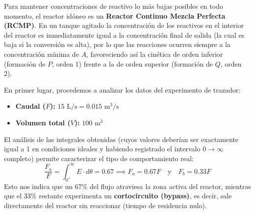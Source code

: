 Para mantener concentraciones de reactivo lo más bajas posibles en todo momento, el reactor idóneo es un \textbf{Reactor Continuo Mezcla Perfecta (RCMP)}. En un tanque agitado la concentración de los reactivos en el interior del reactor es inmediatamente igual a la concentración final de salida (la cual es baja si la conversión es alta), por lo que las reacciones ocurren siempre a la concentración mínima de $A$, favoreciendo así la cinética de orden inferior (formación de $P$, orden 1) frente a la de orden superior (formación de $Q$, orden 2).

\begin{center}
\end{center}

\solve{}
En primer lugar, procedemos a analizar los datos del experimento de trazador:
\begin{itemize}
	\item \textbf{Caudal ($F$):} $15\text{ L/s} = 0.015\text{ m}^3\text{/s}$
	\item \textbf{Volumen total ($V$):} $100\text{ m}^3$
\end{itemize}

El análisis de las integrales obtenidas (cuyos valores deberían ser exactamente igual a 1 en condiciones ideales y habiendo registrado el intervalo $0 \rightarrow \infty$ completo) permite caracterizar el tipo de comportamiento real:
\begin{equation*}
	\frac{F_a}{F} = \int_{0^+}^\infty E \cdot d\theta = 0.67 \implies F_a = 0.67 F \quad \text{y} \quad F_b = 0.33 F
\end{equation*}
Esto nos indica que un $67\%$ del flujo atraviesa la zona activa del reactor, mientras que el $33\%$ restante experimenta un \textbf{cortocircuito (bypass)}, es decir, sale directamente del reactor sin reaccionar (tiempo de residencia nulo).

